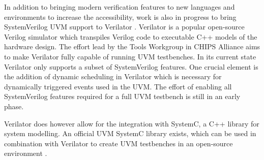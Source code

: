 In addition to bringing modern verification features to new languages and environments to increase the accessibility,
work is also in progress to bring SystemVerilog UVM support to Verilator \cite{uvm_verilator}. Verilator is a popular
open-source
Verilog simulator which transpiles Verilog code to executable C++ models of the hardware design. The effort lead by
the Tools Workgroup in CHIPS Alliance aims to make Verilator fully capable of running UVM testbenches. In its current
state Verilator only supports a subset of SystemVerilog features. One crucial element is the addition of dynamic
scheduling in Verilator which is necessary for dynamically triggered events used in the UVM. The effort of enabling
all SystemVerilog features required for a full UVM testbench is still in an early phase.

Verilator does however allow for the integration with SystemC, a C++ library for system modelling. An official UVM
SystemC library exists, which can be used in combination with Verilator to create UVM testbenches in an open-source
environment \cite{Sasselli2023}.

